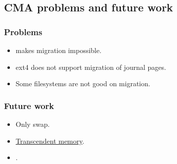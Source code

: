 
\subsection{CMA problems and future work}

\begin{frame}
  \frametitle{Problems}

  \begin{itemize}
  \item {} makes migration impossible.
  \item ext4 does not support migration of journal pages.
  \item Some filesystems are not good on migration.
  \end{itemize}
\end{frame}

\begin{frame}
  \frametitle{Future work}
  \begin{itemize}
  \item Only swap.
  \item \href{http://lwn.net/Articles/340080/}{Transcendent memory}.
  \item \href{http://lwn.net/Articles/468896/}{}.
  \end{itemize}
\end{frame}
